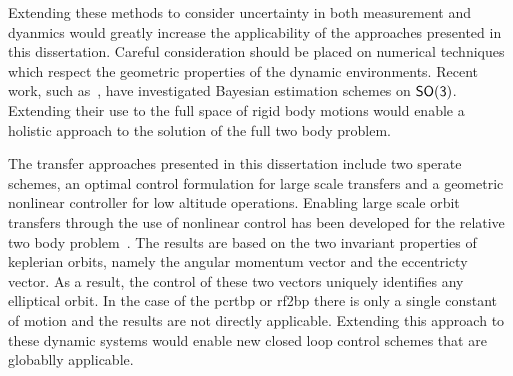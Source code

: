 Extending these methods to consider uncertainty in both measurement and dyanmics would greatly increase the applicability of the approaches presented in this dissertation.
Careful consideration should be placed on numerical techniques which respect the geometric properties of the dynamic environments.
Recent work, such as~\textcite{kulumani2017}, have investigated Bayesian estimation schemes on \( \mathsf{SO(3)} \). 
Extending their use to the full space of rigid body motions would enable a holistic approach to the solution of the full two body problem.

The transfer approaches presented in this dissertation include two sperate schemes, an optimal control formulation for large scale transfers and a geometric nonlinear controller for low altitude operations.
Enabling large scale orbit transfers through the use of nonlinear control has been developed for the relative two body problem~\cite{chang2002}.
The results are based on the two invariant properties of keplerian orbits, namely the angular momentum vector and the eccentricty vector.
As a result, the control of these two vectors uniquely identifies any elliptical orbit.
In the case of the \gls{pcrtbp} or \gls{rf2bp} there is only a single constant of motion and the results are not directly applicable.
Extending this approach to these dynamic systems would enable new closed loop control schemes that are globablly applicable.


